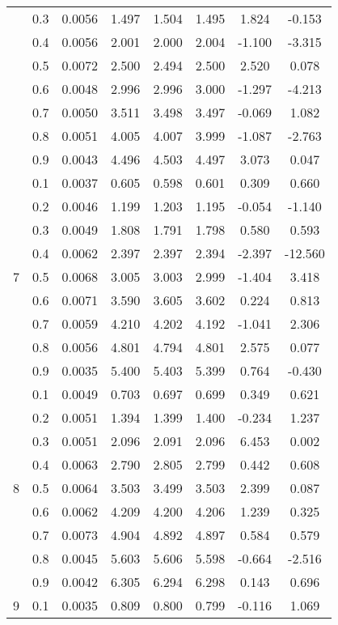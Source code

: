 \documentclass[11pt,a4paper]{report}
\begin{document}
\begin{longtable}{ | c | c || c | c | c | c | c | c | }
 & 0.3 & 0.0056 & 1.497 & 1.504 & 1.495 & 1.824 & -0.153 \\
 & 0.4 & 0.0056 & 2.001 & 2.000 & 2.004 & -1.100 & -3.315 \\
 & 0.5 & 0.0072 & 2.500 & 2.494 & 2.500 & 2.520 & 0.078 \\
 & 0.6 & 0.0048 & 2.996 & 2.996 & 3.000 & -1.297 & -4.213 \\
 & 0.7 & 0.0050 & 3.511 & 3.498 & 3.497 & -0.069 & 1.082 \\
 & 0.8 & 0.0051 & 4.005 & 4.007 & 3.999 & -1.087 & -2.763 \\
 & 0.9 & 0.0043 & 4.496 & 4.503 & 4.497 & 3.073 & 0.047 \\
 \hline
\multirow{9}{*}{7} & 0.1 & 0.0037 & 0.605 & 0.598 & 0.601 & 0.309 & 0.660 \\
 & 0.2 & 0.0046 & 1.199 & 1.203 & 1.195 & -0.054 & -1.140 \\
 & 0.3 & 0.0049 & 1.808 & 1.791 & 1.798 & 0.580 & 0.593 \\
 & 0.4 & 0.0062 & 2.397 & 2.397 & 2.394 & -2.397 & -12.560 \\
 & 0.5 & 0.0068 & 3.005 & 3.003 & 2.999 & -1.404 & 3.418 \\
 & 0.6 & 0.0071 & 3.590 & 3.605 & 3.602 & 0.224 & 0.813 \\
 & 0.7 & 0.0059 & 4.210 & 4.202 & 4.192 & -1.041 & 2.306 \\
 & 0.8 & 0.0056 & 4.801 & 4.794 & 4.801 & 2.575 & 0.077 \\
 & 0.9 & 0.0035 & 5.400 & 5.403 & 5.399 & 0.764 & -0.430 \\
 \hline
\multirow{9}{*}{8} & 0.1 & 0.0049 & 0.703 & 0.697 & 0.699 & 0.349 & 0.621 \\
 & 0.2 & 0.0051 & 1.394 & 1.399 & 1.400 & -0.234 & 1.237 \\
 & 0.3 & 0.0051 & 2.096 & 2.091 & 2.096 & 6.453 & 0.002 \\
 & 0.4 & 0.0063 & 2.790 & 2.805 & 2.799 & 0.442 & 0.608 \\
 & 0.5 & 0.0064 & 3.503 & 3.499 & 3.503 & 2.399 & 0.087 \\
 & 0.6 & 0.0062 & 4.209 & 4.200 & 4.206 & 1.239 & 0.325 \\
 & 0.7 & 0.0073 & 4.904 & 4.892 & 4.897 & 0.584 & 0.579 \\
 & 0.8 & 0.0045 & 5.603 & 5.606 & 5.598 & -0.664 & -2.516 \\
 & 0.9 & 0.0042 & 6.305 & 6.294 & 6.298 & 0.143 & 0.696 \\
 \hline
\multirow{9}{*}{9} & 0.1 & 0.0035 & 0.809 & 0.800 & 0.799 & -0.116 & 1.069 \\

\end{longtable}
\end{document}
